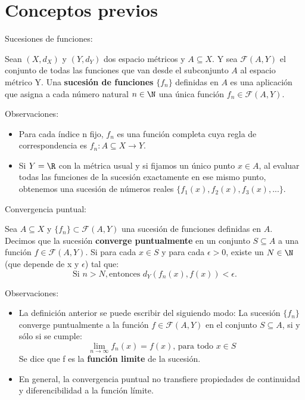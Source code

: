 \section{Conceptos previos}

\begin{frame}{Sucesiones de funciones:}
    \begin{definicion}
        Sean $(X,d_X)$ y $(Y,d_Y)$ dos espacio métricos y $A\subseteq X$. Y sea $\mathcal{F}(A,Y)$ el conjunto de todas las funciones que van desde el subconjunto 
        $A$ al espacio métrico Y. Una \textbf{sucesión de funciones} $\{f_n\}$ definidas en $A$ es una aplicación 
        que asigna  a cada número natural $n\in \N$  una única función $f_n\in \mathcal{F}(A,Y)$.
    \end{definicion}
\end{frame}

\begin{frame}{Observaciones:}
    \begin{itemize}
    \item Para cada índice n fijo, $f_n$ es una función completa cuya regla de correspondencia 
    es $f_n:A\subseteq X\to Y$.
    \item Si $Y=\R$ con la métrica usual y si fijamos un único punto $x \in A$, al evaluar todas las funciones de la sucesión exactamente 
    en ese mismo punto, obtenemos una sucesión de números reales $\{f_{1}(x),f_{2}(x),f_{3}(x),...\}$.
    \end{itemize} 
\end{frame}

\begin{frame}{Convergencia puntual:}
    \begin{definicion}
        Sea $A\subseteq X$ y $\{f_{n}\}\subset \mathcal{F}(A,Y)$ una sucesión de funciones definidas en $A$.
        Decimos que la sucesión \textbf{converge puntualmente} en un conjunto $S\subseteq A$  a una función  $f\in \mathcal{F}(A,Y)$.
        Si para cada $x\in S$ y para cada $\epsilon>0$, existe un $N\in \N$ (que depende de x y $\epsilon$)
        tal que:
        \[
        \text{Si } n>N, \text{entonces } d_{Y}(f_n(x),f(x))<\epsilon. 
        \]
    \end{definicion}
\end{frame}

\begin{frame}{Observaciones:}
    \begin{itemize}
    \item La definición anterior se puede escribir del siguiendo modo: La sucesión $\{f_n\}$ 
    converge puntualmente a la función $f\in \mathcal{F}(A,Y)$ en el conjunto $S\subseteq A$, si y sólo si se cumple:
    \[
     \lim_{n\to \infty} f_{n}(x) = f(x),\,\text{para todo } x\in S
    \]
    Se dice que f es la \textbf{función limite} de la sucesión.
    \item En general, la convergencia puntual no transfiere propiedades de continuidad y diferencibilidad a la función límite.
    \end{itemize} 
\end{frame}


